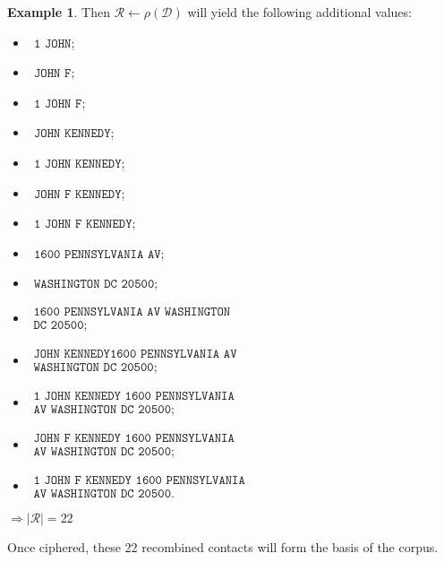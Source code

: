 \documentclass[twoside,twocolumn]{article}
\theoremstyle{definition}
\newtheorem{example}{Example}
\theoremstyle{remark}
\begin{document}
\begin{example}
    Then $\mathcal{R} \gets \rho(\mathcal{D})$ will yield the following additional values:
    \begin{small} \begin{itemize}
        \item $~~\texttt{1 JOHN}$;
        \item $~~\texttt{JOHN F}$;
        \item $~~\texttt{1 JOHN F}$;
        \item $~~\texttt{JOHN KENNEDY}$;
        \item $~~\texttt{1 JOHN KENNEDY}$;
        \item $~~\texttt{JOHN F KENNEDY}$;
        \item $~~\texttt{1 JOHN F KENNEDY}$;
        \item $~~\texttt{1600 PENNSYLVANIA AV}$;
        \item $~~\texttt{WASHINGTON DC 20500}$;
        \item $\begin{array}{l} \texttt{1600 PENNSYLVANIA AV WASHINGTON} \\ \texttt{DC 20500}; \end{array}$
        \item $\begin{array}{l} \texttt{JOHN KENNEDY} \texttt{1600 PENNSYLVANIA AV} \\\texttt{WASHINGTON DC 20500}; \end{array}$
        \item $\begin{array}{l} \texttt{1 JOHN KENNEDY 1600 PENNSYLVANIA} \\ \texttt{AV WASHINGTON DC 20500}; \end{array}$
        \item $\begin{array}{l} \texttt{JOHN F KENNEDY 1600 PENNSYLVANIA} \\ \texttt{AV WASHINGTON DC 20500}; \end{array}$
        \item $\begin{array}{l} \texttt{1 JOHN F KENNEDY 1600 PENNSYLVANIA} \\ \texttt{AV WASHINGTON DC 20500}. \end{array}$
    \end{itemize} \end{small}
    $\Longrightarrow |\mathcal{R}| = 22$

    Once ciphered, these 22 recombined contacts will form the basis of the corpus.
\end{example}
\end{document}
